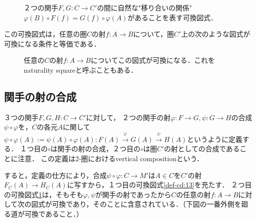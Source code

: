 \documentclass[uplatex, 12pt, dvipdfmx]{jsreport}
\begin{document}
\begin{figure}[h]\begin{center}
    \caption{２つの関手$F,G:C\to C'$の間に自然な"移り合いの関係"$\varphi (B)\circ F(f)=G(f)\circ\varphi (A)$があることを表す可換図式．\label{def-cd:15}}
\end{center}\end{figure}
この可換図式は，任意の圏$C$の射$f:A\to B$について，圏$C'$上の次のような図式が可換になる条件と等価である．
\begin{figure}[h]\begin{center}\caption{任意の$C$の射$f:A\to B$についてこの図式が可換になる．これをnaturality squareと呼ぶこともある．\label{def-cd:15'}}\end{center}\end{figure}

\subsection{関手の射の合成}
３つの関手$F,G,H:C\rightarrow C'$に対して，
２つの関手の射$\varphi :F\rightarrow G, \psi :G\rightarrow H$の合成$\psi\circ\varphi$を，$C$の各元$A$に関して
$\psi\circ\varphi (A):=\psi (A)\circ\varphi (A):F(A)\xrightarrow{\varphi}G(A)\xrightarrow{\psi} H(A)$というように定義する．
１つ目の$\circ$は関手の射の合成，２つ目の$\circ$は圏$C'$の射としての合成であることに注意．
この定義は2-圏におけるvertical compositionという．

すると，定義の仕方により，合成$\psi\circ\varphi :C\to M'$は$A\in C$を$C'$の射$F_C(A)\to H_C(A)$に写すから，１つ目の可換図式\ref{def-cd:13}を充たす．
２つ目の可換図式\ref{def-cd:15}は，そもそも$\varphi, \psi$が関手の射であったから$C$の任意の射$f:A\to B$に対して次の図式が可換であり，そのことに含意されている．（下図の一番外側を廻る道が可換であること．）
\begin{center}\end{center}
\end{document}
